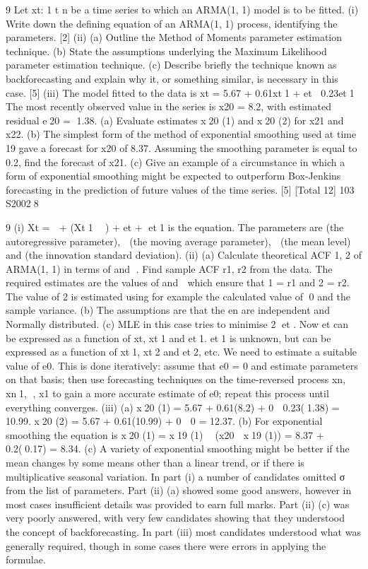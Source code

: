 
9 Let {xt: 1 
 t 
 n} be a time series to which an ARMA(1, 1) model is to be fitted.
(i) Write down the defining equation of an ARMA(1, 1) process, identifying the
parameters. [2]
(ii) (a) Outline the Method of Moments parameter estimation technique.
(b) State the assumptions underlying the Maximum Likelihood parameter
estimation technique.
(c) Describe briefly the technique known as backforecasting and explain
why it, or something similar, is necessary in this case. [5]
(iii) The model fitted to the data is
xt = 5.67 + 0.61xt1 + et 0.23et1
The most recently observed value in the series is x20 = 8.2, with estimated
residual e20 = 1.38.
(a) Evaluate estimates x20 (1) and x20 (2) for x21 and x22.
(b) The simplest form of the method of exponential smoothing used at
time 19 gave a forecast for x20 of 8.37. Assuming the smoothing
parameter is equal to 0.2, find the forecast of x21.
(c) Give an example of a circumstance in which a form of exponential
smoothing might be expected to outperform Box-Jenkins forecasting in
the prediction of future values of the time series. [5]
[Total 12]
103 S20028





9 (i) Xt =  + 
(Xt1  ) + et + et1 is the equation.
The parameters are 
 (the autoregressive parameter),  (the moving average
parameter),  (the mean level) and 	 (the innovation standard deviation).
(ii) (a) Calculate theoretical ACF 
1, 
2 of ARMA(1, 1) in terms of 
 and .
Find sample ACF r1, r2 from the data. The required estimates are the
values of 
 and  which ensure that 
1 = r1 and 
2 = r2.
The value of 	
2 is estimated using for example the calculated value of
0 and the sample variance.
(b) The assumptions are that the en are independent and Normally
distributed.
(c) MLE in this case tries to minimise 2
et . Now et can be expressed as
a function of xt, xt1 and et1. et1 is unknown, but can be expressed as
a function of xt1, xt2 and et2, etc. We need to estimate a suitable
value of e0.
This is done iteratively: assume that e0 = 0 and estimate parameters on
that basis; then use forecasting techniques on the time-reversed process
{xn, xn1, , x1} to gain a more accurate estimate of e0; repeat this
process until everything converges.
(iii) (a) x20 (1) = 5.67 + 0.61(8.2) + 0  0.23(1.38) = 10.99.
x20 (2) = 5.67 + 0.61(10.99) + 0  0 = 12.37.
(b) For exponential smoothing the equation is
x20 (1) = x19 (1)  (x20  x19 (1)) = 8.37 + 0.2(0.17) = 8.34.
(c) A variety of exponential smoothing might be better if the mean
changes by some means other than a linear trend, or if there is
multiplicative seasonal variation.
In part (i) a number of candidates omitted σ from the list of parameters. Part (ii) (a) showed
some good answers, however in most cases insufficient details was provided to earn full
marks. Part (ii) (c) was very poorly answered, with very few candidates showing that they
understood the concept of backforecasting. In part (iii) most candidates understood what
was generally required, though in some cases there were errors in applying the formulae.

